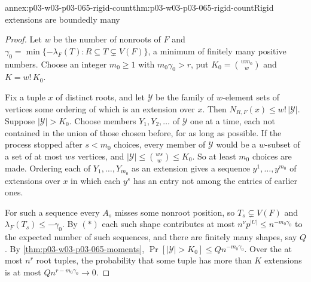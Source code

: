 \begin{annexitem}{annex:p03-w03-p03-065-rigid-count}{thm:p03-w03-p03-065-rigid-count}{Rigid extensions are boundedly many}
\begin{proof}
Let \(w\) be the number of nonroots of \(F\) and
\(\gamma_0=\min\{-\lambda_F(T):R\subseteq T\subsetneq V(F)\}\), a minimum of
finitely many positive numbers.  Choose an integer \(m_0\geq1\) with
\(m_0\gamma_0>r\), put \(K_0=\binom{wm_0}w\) and \(K=w!\,K_0\).

Fix a tuple \(x\) of distinct roots, and let \(\mathcal Y\) be the family of
\(w\)-element sets of vertices some ordering of which is an extension over
\(x\).  Then \(N_{R,F}(x)\leq w!\,|\mathcal Y|\).  Suppose
\(|\mathcal Y|>K_0\).  Choose members \(Y_1,Y_2,\ldots\) of \(\mathcal Y\) one
at a time, each not contained in the union of those chosen before, for as
long as possible.  If the process stopped after \(s<m_0\) choices, every
member of \(\mathcal Y\) would be a \(w\)-subset of a set of at most \(ws\)
vertices, and \(|\mathcal Y|\leq\binom{ws}w\leq K_0\).  So at least \(m_0\)
choices are made.  Ordering each of \(Y_1,\ldots,Y_{m_0}\) as an extension
gives a sequence \(y^1,\ldots,y^{m_0}\) of extensions over \(x\) in which
each \(y^s\) has an entry not among the entries of earlier ones.

For such a sequence every \(A_s\) misses some nonroot position, so
\(T_s\subsetneq V(F)\) and \(\lambda_F(T_s)\leq-\gamma_0\).  By \((\ast)\)
each such shape contributes at most \(n^{\nu}p^{|U|}\leq n^{-m_0\gamma_0}\) to
the expected number of such sequences, and there are finitely many shapes,
say \(Q\).  By \cref{thm:p03-w03-p03-065-moments},
\(\Pr[|\mathcal Y|>K_0]\leq Qn^{-m_0\gamma_0}\).  Over the at most \(n^r\)
root tuples, the probability that some tuple has more than \(K\) extensions
is at most \(Qn^{r-m_0\gamma_0}\to0\).
\end{proof}
\end{annexitem}

